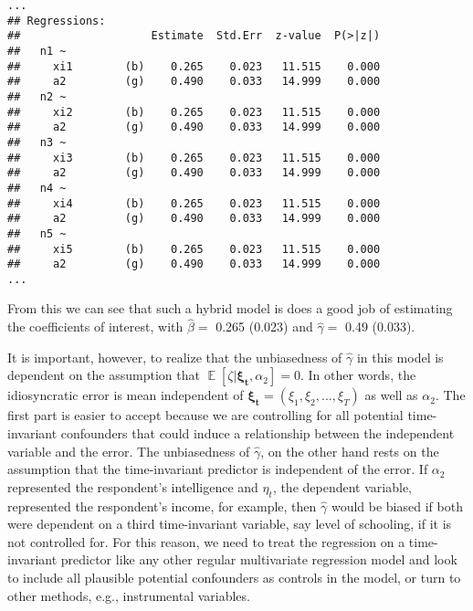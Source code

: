 \documentclass[]{interact}
\theoremstyle{plain}%
\theoremstyle{definition}
\theoremstyle{remark}
\begin{document}
\begin{verbatim}
...
## Regressions:
##                    Estimate  Std.Err  z-value  P(>|z|)
##   n1 ~                                                
##     xi1        (b)    0.265    0.023   11.515    0.000
##     a2         (g)    0.490    0.033   14.999    0.000
##   n2 ~                                                
##     xi2        (b)    0.265    0.023   11.515    0.000
##     a2         (g)    0.490    0.033   14.999    0.000
##   n3 ~                                                
##     xi3        (b)    0.265    0.023   11.515    0.000
##     a2         (g)    0.490    0.033   14.999    0.000
##   n4 ~                                                
##     xi4        (b)    0.265    0.023   11.515    0.000
##     a2         (g)    0.490    0.033   14.999    0.000
##   n5 ~                                                
##     xi5        (b)    0.265    0.023   11.515    0.000
##     a2         (g)    0.490    0.033   14.999    0.000
...
\end{verbatim}

\doublespacing

From this we can see that such a hybrid model is does a good job of
estimating the coefficients of interest, with \(\hat{\beta} =\) 0.265
(0.023) and \(\hat{\gamma} =\) 0.49 (0.033).

It is important, however, to realize that the unbiasedness of
\(\hat{\gamma}\) in this model is dependent on the assumption that
\(\mathop{\mathrm{\mathbb{E}}}[\zeta | \bm{\xi_{t}}, \alpha_{2}] = 0\).
In other words, the idiosyncratic error is mean independent of
\(\bm{\xi_{t}} = (\xi_{1}, \xi_{2}, ..., \xi_{T})\) as well as
\(\alpha_{2}\). The first part is easier to accept because we are
controlling for all potential time-invariant confounders that could
induce a relationship between the independent variable and the error.
The unbiasedness of \(\hat{\gamma}\), on the other hand rests on the
assumption that the time-invariant predictor is independent of the
error. If \(\alpha_{2}\) represented the respondent's intelligence and
\(\eta_{t}\), the dependent variable, represented the respondent's
income, for example, then \(\hat{\gamma}\) would be biased if both were
dependent on a third time-invariant variable, say level of schooling, if
it is not controlled for. For this reason, we need to treat the
regression on a time-invariant predictor like any other regular
multivariate regression model and look to include all plausible
potential confounders as controls in the model, or turn to other
methods, e.g., instrumental variables.



\end{document}

